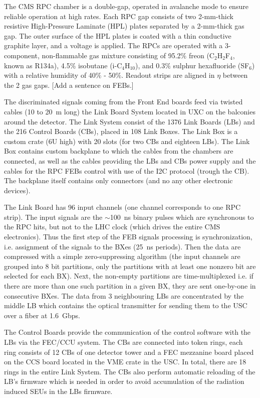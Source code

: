 	The CMS RPC chamber is a double-gap, operated in avalanche mode to ensure reliable operation at high rates. Each RPC gap consists of two 2-mm-thick resistive High-Pressure Laminate (HPL) plates separated by a 2-mm-thick gas gap. The outer surface of the HPL plates is coated with a thin conductive graphite layer, and a voltage is applied. The RPCs are operated with a 3-component, non-flammable gas mixture consisting of 95.2$\%$ freon (C$_2$H$_2$F$_4$, known as R134a), 4.5$\%$ isobutane (i-C$_4$H$_{10}$), and 0.3$\%$  sulphur hexafluoride (SF$_6$) with a relative humidity of 40$\%$ - 50$\%$. Readout strips are aligned in $\eta$ between the 2 gas gaps. {\color{blue} [Add a sentence on FEBs.]}

	The discriminated signals coming from the Front End boards feed via twisted cables (10 to \SI{20}{m} long) the Link Board System located in UXC on the balconies around the detector. The Link System consist of the 1376 Link Boards (LBs) and the 216 Control Boards (CBs), placed in 108 Link Boxes. The Link Box is a custom crate (6U high) with 20 slots (for two CBs and eighteen LBs). The Link Box contains custom backplane to which the cables from the chambers are connected, as well as the cables providing the LBs and CBs power supply and the cables for the RPC FEBs control with use of the I2C protocol (trough the CB). The backplane itself contains only connectors (and no any other electronic devices).

	The Link Board has 96 input channels (one channel corresponds to one RPC strip). The input signals are the $\sim$\SI{100}{ns} binary pulses which are synchronous to the RPC hits, but not to the LHC clock (which drives the entire CMS electronics). Thus the first step of the FEB signals processing is synchronization, i.e. assignment of the signals to the BXes (\SI{25}{ns} periods). Then the data are compressed with a simple zero-suppressing algorithm (the input channels are grouped into 8 bit partitions, only the partitions with at least one nonzero bit are selected for each BX). Next, the non-empty partitions are time-multiplexed i.e. if there are more than one such partition in a given BX, they are sent one-by-one in consecutive BXes. The data from 3 neighbouring LBs are concentrated by the middle LB which contains the optical transmitter for sending them to the USC over a fiber 
at \SI{1.6}{Gbps}.

	The Control Boards provide the communication of the control software with the LBs via the FEC/CCU system. The CBs are connected into token rings, each ring consists of 12 CBs of one detector tower and a FEC mezzanine board placed on the CCS board located in the VME crate in the USC. In total, there are 18 rings in the entire Link System. The CBs also perform automatic reloading of the LB's firmware which is needed in order to avoid accumulation of the radiation induced SEUs in the LBs firmware. 


